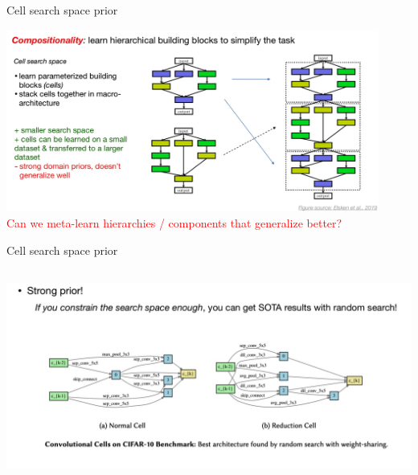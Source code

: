\documentclass[aspectratio=169,t,handout,xcolor={usenames,dvipsnames}]{beamer}
\begin{document}
\begin{frame}{Cell search space prior}

\centering\includegraphics[height=6cm]{image/Jietu20220328-200520.jpg}
\pause
\\\small\textcolor{red}{Can we meta-learn hierarchies / components that generalize better?}

\end{frame}

\begin{frame}{Cell search space prior}

\centering\includegraphics[height=7cm]{image/Jietu20220328-200717.jpg}


\end{frame}
\end{document}

